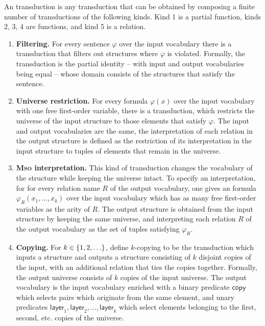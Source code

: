 \begin{definition}\label{def:mso-transduction}
    An \mso transduction is any transduction that can be obtained by composing a finite number of transductions of the following kinds.
Kind 1 is a partial function, kinds 2, 3, 4 are functions, and kind 5 is a relation.
\begin{enumerate}
	\item {\bf Filtering.} For every \mso sentence $\varphi$ over the input vocabulary there is a transduction that filters out structures where $\varphi$ is violated. Formally, the transduction is the partial identity -- with input and output vocabularies being equal --  whose domain consists of the structures that satisfy the sentence. 
	\item {\bf Universe restriction.} For every \mso formula $\varphi(x)$ over the input vocabulary with one free first-order variable, there is a transduction, which restricts the universe of the input structure to those elements that satisfy $\varphi$. The input and output vocabularies are the same, the interpretation of each relation in the output structure is defined as the restriction of its interpretation 
	in the input structure to tuples of elements that remain in the universe.
	\item {\bfseries{\scshape{Mso}} interpretation.} This kind of transduction changes the vocabulary of the structure while keeping the universe intact. To specify an \mso interpretation, for for every relation name $R$ of the output vocabulary, one gives an \mso formula $\varphi_R(x_1,\ldots,x_k)$ over the input vocabulary which has as many free first-order variables as the arity of $R$. The output structure is obtained from the input structure by keeping the same universe, and interpreting each relation $R$ of the output vocabulary as the set of tuples  satisfying $\varphi_R$.
	\item {\bf Copying.} For  $k \in \{1,2,\ldots\}$, define $k$-copying to be the transduction which inputs a structure and outputs a structure consisting of $k$ disjoint copies of the input, with an additional relation that ties the copies together. Formally, the output universe consists of $k$ copies of the input universe.
	The output vocabulary is the input vocabulary enriched with a binary predicate $\mathsf{copy}$ which selects pairs which originate from the same element, and unary predicates $\mathsf{layer}_1,\mathsf{layer}_2,\ldots,\mathsf{layer}_k$ which select elements belonging to the first, second, etc. copies of the universe.

\end{enumerate}
\end{definition}
